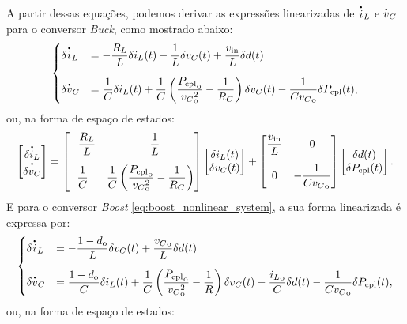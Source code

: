 A partir dessas equações, podemos derivar as expressões linearizadas de $\dt{i}_L$ e $\dt{v}_C$ para o conversor \textit{Buck}, como mostrado abaixo: \begin{equation} \begin{cases} \delta \dt{i}_L &= \displaystyle -\frac{R_L}{L} \delta i_L(t) - \frac{1}{L} \delta v_C(t) + \frac{v_{\mathrm{in}}}{L} \delta d(t) \\[12pt] \delta \dt{v}_C &= \displaystyle \frac{1}{C} \delta i_L(t) + \frac{1}{C} \left(\frac{{P_{\mathrm{cpl}}}_{\mathrm{o}}}{{v_C}^2_{\mathrm{o}}} - \frac{1}{R_C}\right) \delta v_C(t) - \frac{1}{C{v_C}_{\mathrm{o}}} \delta P_{\mathrm{cpl}}(t), \end{cases} \end{equation} ou, na forma de espaço de estados: \begin{equation} \begin{bmatrix} \dt{\delta i_L} \\ \dt{\delta v_C} \end{bmatrix} = \begin{bmatrix} \displaystyle -\frac{R_L}{L} & \displaystyle -\frac{1}{L}  \\[12pt] \displaystyle \frac{1}{C} & \displaystyle \frac{1}{C}\left(\frac{{P_{\mathrm{cpl}}}_{\mathrm{o}}}{{{v_{C}}^2_{\mathrm{o}}}} - \frac{1}{R_C}\right) \end{bmatrix} \begin{bmatrix} \delta i_L(t) \\ \delta v_C(t) \end{bmatrix} + \begin{bmatrix} {\displaystyle \frac{v_{\mathrm{in}}}{L}} & 0 \\[12pt] 0 & \displaystyle {-\frac{1}{C{v_C}_{\mathrm{o}}}} \end{bmatrix}  \begin{bmatrix} \delta d(t) \\ \delta P_{\mathrm{cpl}}(t) \end{bmatrix}. \label{eq:buck_linear_system}\end{equation} E para o conversor \textit{Boost} \eqref{eq:boost_nonlinear_system}, a sua forma linearizada é expressa por: \begin{equation} \begin{cases} \delta \dt{i}_L &= \displaystyle - \frac{1 - d_{\mathrm{o}}}{L} \delta v_C(t) + \frac{{v_C}_{\mathrm{o}}}{L}\delta d(t) \\[12pt] \delta \dt{v}_C &= \displaystyle \frac{1 - d_{\mathrm{o}}}{C} \delta i_L(t) + \frac{1}{C} \left(\frac{{P_{\mathrm{cpl}}}_{\mathrm{o}}}{{v_C}^2_{\mathrm{o}}} - \frac{1}{R}\right) \delta v_C(t) - \frac{{i_L}_{\mathrm{o}}}{C} \delta d(t) - \frac{1}{C{v_C}_{\mathrm{o}}} \delta P_{\mathrm{cpl}}(t), \end{cases} \end{equation} ou, na forma de espaço de estados: \begin{equation} 

\end{equation}
